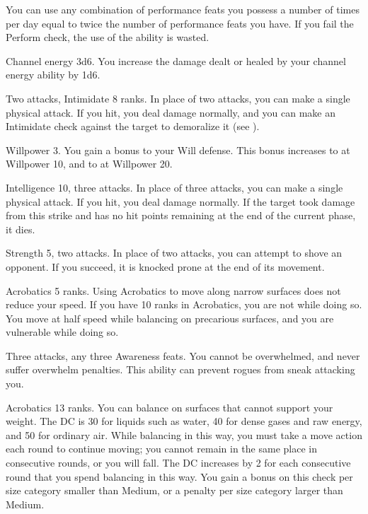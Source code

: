 You can use any combination of performance feats you possess a number of times per day equal to twice the number of performance feats you have.
If you fail the Perform check, the use of the ability is wasted.

\featpre Channel energy 3d6.
\featben You increase the damage dealt or healed by your channel energy ability by 1d6.

\featpres Two attacks, Intimidate 8 ranks.
\featben In place of two attacks, you can make a single physical attack.
If you hit, you deal damage normally, and you can make an Intimidate check against the target to demoralize it (see ).

\featpre Willpower 3.
\featben You gain a  bonus to your Will defense.
This bonus increases to  at Willpower 10, and to  at Willpower 20.

\featpre Intelligence 10, three attacks.
\featben In place of three attacks, you can make a single physical attack.
If you hit, you deal damage normally.
If the target took damage from this strike and has no hit points remaining at the end of the current phase, it dies.

\featpre Strength 5, two attacks.
\featben In place of two attacks, you can attempt to shove an opponent.
If you succeed, it is knocked prone at the end of its movement.

\featpre Acrobatics 5 ranks.
\featben Using Acrobatics to move along narrow surfaces does not reduce your speed.
If you have 10 ranks in Acrobatics, you are not \vulnerable while doing so.
You move at half speed while balancing on precarious surfaces, and you are vulnerable while doing so.

\featpres Three attacks, any three Awareness feats.
\featben You cannot be overwhelmed, and never suffer overwhelm penalties.
This ability can prevent rogues from sneak attacking you.

\featpre Acrobatics 13 ranks.
\featben You can balance on surfaces that cannot support your weight.
The DC is 30 for liquids such as water, 40 for dense gases and raw energy, and 50 for ordinary air.
While balancing in this way, you must take a move action each round to continue moving; you cannot remain in the same place in consecutive rounds, or you will fall.
The DC increases by 2 for each consecutive round that you spend balancing in this way.
You gain a  bonus on this check per size category smaller than Medium, or a  penalty per size category larger than Medium.

